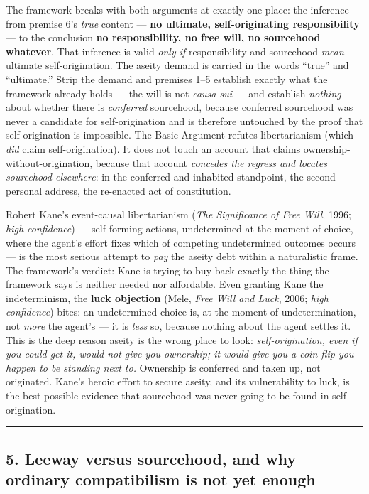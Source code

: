 \documentclass[11pt]{article}
\begin{document}
The framework breaks with both arguments at exactly one place: the inference from premise 6's \emph{true} content — \textbf{no ultimate, self-originating responsibility} — to the conclusion \textbf{no responsibility, no free will, no sourcehood whatever}. That inference is valid \emph{only if} responsibility and sourcehood \emph{mean} ultimate self-origination. The aseity demand is carried in the words ``true'' and ``ultimate.'' Strip the demand and premises 1–5 establish exactly what the framework already holds — the will is not \emph{causa sui} — and establish \emph{nothing} about whether there is \emph{conferred} sourcehood, because conferred sourcehood was never a candidate for self-origination and is therefore untouched by the proof that self-origination is impossible. The Basic Argument refutes libertarianism (which \emph{did} claim self-origination). It does not touch an account that claims ownership-without-origination, because that account \emph{concedes the regress and locates sourcehood elsewhere}: in the conferred-and-inhabited standpoint, the second-personal address, the re-enacted act of constitution.

Robert Kane's event-causal libertarianism (\emph{The Significance of Free Will}, 1996; \emph{high confidence}) — self-forming actions, undetermined at the moment of choice, where the agent's effort fixes which of competing undetermined outcomes occurs — is the most serious attempt to \emph{pay} the aseity debt within a naturalistic frame. The framework's verdict: Kane is trying to buy back exactly the thing the framework says is neither needed nor affordable. Even granting Kane the indeterminism, the \textbf{luck objection} (Mele, \emph{Free Will and Luck}, 2006; \emph{high confidence}) bites: an undetermined choice is, at the moment of undetermination, not \emph{more} the agent's — it is \emph{less} so, because nothing about the agent settles it. This is the deep reason aseity is the wrong place to look: \emph{self-origination, even if you could get it, would not give you ownership; it would give you a coin-flip you happen to be standing next to.} Ownership is conferred and taken up, not originated. Kane's heroic effort to secure aseity, and its vulnerability to luck, is the best possible evidence that sourcehood was never going to be found in self-origination.

\medskip\noindent\rule{\linewidth}{0.3pt}\medskip

\subsection*{5. Leeway versus sourcehood, and why ordinary compatibilism is not yet enough}
\end{document}
